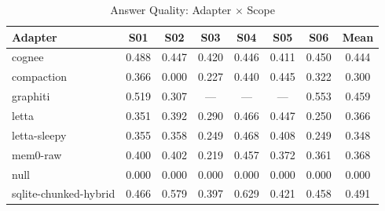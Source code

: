 \begin{table}[t]
\centering
\caption{Answer Quality: Adapter $\times$ Scope}
\label{tab:heatmap}
\begin{tabular}{lccccccc}
\toprule
Adapter & S01 & S02 & S03 & S04 & S05 & S06 & Mean \\
\midrule
  cognee & 0.488 & 0.447 & 0.420 & 0.446 & 0.411 & 0.450 & 0.444 \\
  compaction & 0.366 & 0.000 & 0.227 & 0.440 & 0.445 & 0.322 & 0.300 \\
  graphiti & 0.519 & 0.307 & --- & --- & --- & 0.553 & 0.459 \\
  letta & 0.351 & 0.392 & 0.290 & 0.466 & 0.447 & 0.250 & 0.366 \\
  letta-sleepy & 0.355 & 0.358 & 0.249 & 0.468 & 0.408 & 0.249 & 0.348 \\
  mem0-raw & 0.400 & 0.402 & 0.219 & 0.457 & 0.372 & 0.361 & 0.368 \\
  null & 0.000 & 0.000 & 0.000 & 0.000 & 0.000 & 0.000 & 0.000 \\
  sqlite-chunked-hybrid & 0.466 & 0.579 & 0.397 & 0.629 & 0.421 & 0.458 & 0.491 \\
\bottomrule
\end{tabular}
\end{table}